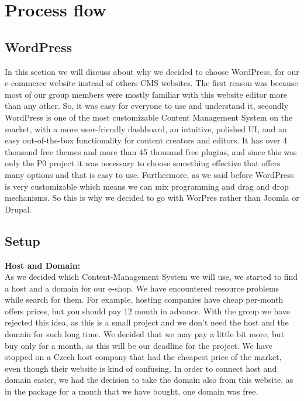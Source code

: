 \documentclass[12p]{article}
\begin{document}
\newpage


\newpage
\section{Process flow}

\subsection{WordPress}

In this section we will discuss about why we decided to choose WordPress, for our e-commerce website instead of others CMS websites. The first reason was because most of our group members were mostly familiar with this website editor more than any other. So, it was easy for everyone to use and understand it, secondly WordPress is one of the most customizable Content Management System on the market, with a more user-friendly dashboard, an intuitive, polished UI, and an easy out-of-the-box functionality for content creators and editors. It has over 4 thousand free themes and more than 45 thousand free plugins, and since this was only the P0 project it was necessary to choose something effective that offers many options and that is easy to use. Furthermore, as we said before WordPress is very customizable which means we can mix programming and drag and drop mechanisms. So this is why we decided to go with WorPres rather than Joomla or Drupal.          


\subsection{Setup}
\textbf{Host and Domain:}
\\
As we decided which Content-Management System we will use, we started to find a host and a domain for our e-shop. We have encountered resource problems while search for them. For example, hosting companies have cheap per-month offers prices, but you should pay 12 month in advance. With the group we have rejected this idea, as this is a small project and we don’t need the host and the domain for such long time. We decided that we may pay a little bit more, but buy only for a month, as this will be our deadline for the project. We have stopped on a Czech host company that had the cheapest price of the market, even though their website is kind of confusing. In order to connect host and domain easier, we had the decision to take the domain also from this website, as in the package for a month that we have  bought, one domain was free. \\
\end{document}
